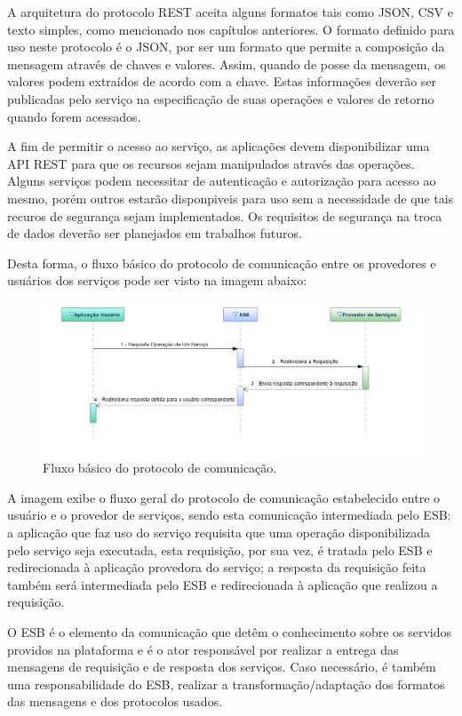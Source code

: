 A arquitetura do protocolo REST aceita alguns formatos tais como JSON, CSV e texto simples, como mencionado nos capítulos anteriores. O formato definido para uso neste protocolo é o JSON, por ser um formato que permite a composição da mensagem através de chaves e valores. Assim, quando de posse da mensagem, os valores podem extraídos de acordo com a chave. Estas informações deverão ser publicadas pelo serviço na especificação de suas operações e valores de retorno quando forem acessados.

A fim de permitir o acesso ao serviço, as aplicações devem disponibilizar uma API REST para que os recursos sejam manipulados através das operações. Alguns serviços podem necessitar de autenticação e autorização para acesso ao mesmo, porém outros estarão disponpiveis para uso sem a necessidade de que tais recuros de segurança sejam implementados. Os requisitos de segurança na troca de dados deverão ser planejados em trabalhos futuros.

Desta forma, o fluxo básico do protocolo de comunicação entre os provedores e usuários dos serviços pode ser visto na imagem abaixo: 

\begin{figure}[htb]
\centering
\includegraphics[width=1\textwidth]{figuras/fluxo_basico_protocolo.PNG}
\caption{Fluxo básico do protocolo de comunicação.}
\label{fluxo_basico_protocolo}
\end{figure}

A imagem exibe o fluxo geral do protocolo de comunicação estabelecido entre o usuário e o provedor de serviços, sendo esta comunicação intermediada pelo ESB: a aplicação que faz uso do serviço requisita que uma operação disponibilizada pelo serviço seja executada, esta requisição, por sua vez, é tratada pelo ESB e redirecionada à aplicação provedora do serviço; a resposta da requisição feita também será intermediada pelo ESB e redirecionada à aplicação que realizou a requisição.

O ESB é o elemento da comunicação que detêm o conhecimento sobre os servidos providos na plataforma e é o ator responsável por realizar a entrega das mensagens de requisição e de resposta dos serviços. Caso necessário, é também uma responsabilidade do ESB, realizar a transformação/adaptação dos formatos das mensagens e dos protocolos usados.

